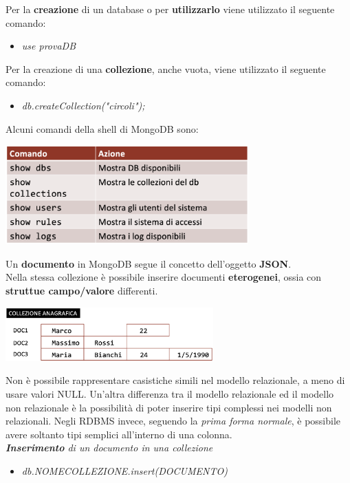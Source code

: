 \documentclass{article}
\begin{document}
Per la \textbf{creazione} di un database o per \textbf{utilizzarlo} viene utilizzato il seguente comando:
\begin{itemize}[label={ }, leftmargin=1cm]
    \itemsep0em
    \item \textit{use provaDB}
\end{itemize}
Per la creazione di una \textbf{collezione}, anche vuota, viene utilizzato il seguente comando:
\begin{itemize}[label={ }, leftmargin=1cm]
    \itemsep0em
    \item \textit{db.createCollection("circoli");}
\end{itemize}
Alcuni comandi della shell di MongoDB sono:
\begin{center}
    \includegraphics[width=0.7\textwidth]{foto 2.png}
\end{center}
Un \textbf{documento} in MongoDB segue il concetto dell'oggetto \textbf{JSON}.\\
Nella stessa collezione è possibile inserire documenti \textbf{eterogenei}, ossia con \textbf{struttue campo/valore} differenti.
\begin{center}
    \includegraphics[width=0.6\textwidth]{foto 3.png}
\end{center}
Non è possibile rappresentare casistiche simili nel modello relazionale, a meno di usare valori NULL. Un'altra differenza tra il modello relazionale ed il modello non relazionale è la possibilità di poter inserire tipi complessi nei modelli non relazionali. Negli RDBMS invece, seguendo la \textit{prima forma normale}, è possibile avere soltanto tipi semplici all'interno di una colonna.\vspace{14pt}\\
\textit{\textbf{Inserimento} di un documento in una collezione}
\begin{itemize}[label={ }, leftmargin=1cm]
    \itemsep0em
    \item \textit{db.NOMECOLLEZIONE.insert(DOCUMENTO)}
\end{itemize}
\end{document}
